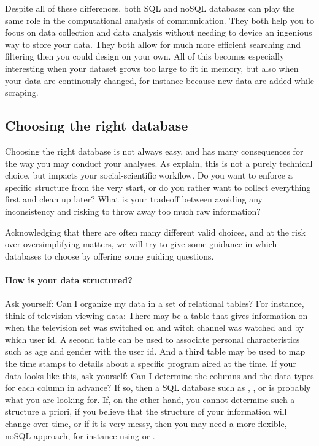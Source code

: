 Despite all of these differences, both SQL and noSQL databases can play
the same role in the computational analysis of communication. They both
help you to focus on data collection and data analysis without needing
to device an ingenious way to store your data. They both allow for much
more efficient searching and filtering then you could design on your own.
All of this becomes especially interesting when your dataset grows too
large to fit in memory, but also when your data are continously changed,
for instance because new data are added while scraping.


\subsection{Choosing the right database}
Choosing the right database is not always easy, and has many consequences
for the way you may conduct your analyses. As \citet{Gunther2018} explain,
this is not a purely technical choice, but impacts your social-scientific
workflow. Do you want to enforce a specific structure from the very
start, or do you rather want to collect everything first and clean up
later? What is your tradeoff between avoiding any inconsistency and risking
to throw away too much raw information? 

Acknowledging that there are often many different valid choices, and at
the risk over oversimplifying matters, we will try to give some guidance
in which databases to choose by offering some guiding questions.


\paragraph{How is your data structured?} Ask yourself: Can I organize my data
in a set of relational tables? For instance, think of television
viewing data: There may be a table that gives information on when the
television set was switched on and witch channel was watched and by
which user id. A second table can be used to associate personal
characteristics such as age and gender with the user id. And a third
table may be used to map the time stamps to details about a specific
program aired at the time.  If your data looks like this, ask
yourself: Can I determine the columns and the data types for each
column in advance?  If so, then a SQL database such as ,
, or  is probably what you are looking
for. If, on the other hand, you cannot determine such a structure a
priori, if you believe that the structure of your information will
change over time, or if it is very messy, then you may need a more
flexible, noSQL approach, for instance using  or
.

